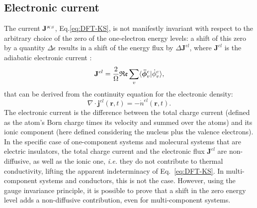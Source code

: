 \subsection{Electronic current}
\begin{LEtext}
The current $\mathbf{J}^{\scriptscriptstyle KS}$, Eq.\eqref{eq:DFT-KS}, is not manifestly invariant with respect to the arbitrary choice of the zero of the one-electron energy levels: a shift of this zero by a quantity $\Delta\epsilon$ results in a shift of the energy flux by $\Delta \mathbf{J}^{el}$, where $\mathbf{J}^{el}$ is the adiabatic electronic current \cite{Thouless1983}:
\begin{equation}
 \mathbf J^{el} = \frac{2}{\rOmega}\mathfrak{Re} \sum_{v} \langle\bm{\bar \phi}_v^c |\dot \phi_v^c \rangle, \label{eq:DFT-electronic}
\end{equation}
that can be derived from the continuity equation for the electronic density:
\begin{equation}
\nabla\cdot \bm j^{el}(\bm r,t) =- \dot{n}^{el}(\bm r,t).    
\end{equation}
The electronic current is the difference between the total charge current (defined as the atom's Born charge times its velocity and summed over the atoms) and its ionic component (here defined considering the nucleus plus the valence electrons). 
In the specific case of one-component systems and molecural systems that are electric insulators, the total charge current and the electronic flux $\mathbf{J}^{el}$ are non-diffusive, as well as the ionic one, \emph{i.e.} they do not contribute to thermal conductivity, lifting the apparent indeterminacy of Eq.~\eqref{eq:DFT-KS}. 
In multi-component systems and conductors, this is not the case. 
However, using the gauge invariance principle, it is possible to prove that a shift in the zero energy level adds a non-diffusive contribution, even for multi-component systems. 
\end{LEtext}



